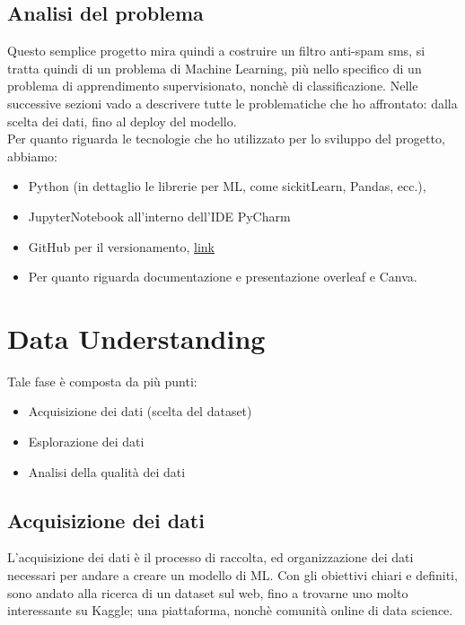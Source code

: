 \documentclass[]{article}
\begin{document}
        \newpage
        \subsection{Analisi del problema}
            Questo semplice progetto mira quindi a costruire un filtro anti-spam sms, si tratta quindi di un problema di Machine Learning, più nello specifico di un problema di apprendimento supervisionato, nonchè di classificazione. Nelle successive sezioni vado a descrivere tutte le problematiche che ho affrontato: dalla scelta dei dati, fino al deploy del modello.\\
            Per quanto riguarda le tecnologie che ho utilizzato per lo sviluppo del progetto, abbiamo:
            \begin{itemize}
                \item Python (in dettaglio le librerie per ML, come sickitLearn, Pandas,  ecc.),
                \item JupyterNotebook all'interno dell'IDE PyCharm
                \item GitHub per il versionamento,  \href{https://github.com/russosamuele/SMSecure.git}{link}
                \item Per quanto riguarda documentazione e presentazione overleaf e Canva.
            \end{itemize}
\newpage
\section{Data Understanding}
    Tale fase è composta da più punti:
    \begin{itemize}
        \item Acquisizione dei dati (scelta del dataset)
        \item Esplorazione dei dati
        \item Analisi della qualità dei dati
    \end{itemize}
    \subsection{Acquisizione dei dati}
        L'acquisizione dei dati è il processo di raccolta, ed organizzazione dei dati necessari per andare a creare un modello di ML. Con gli obiettivi chiari e definiti, sono andato alla ricerca di un dataset sul web, fino a trovarne uno molto interessante su Kaggle; una piattaforma, nonchè comunità online di data science. \\
\end{document}
